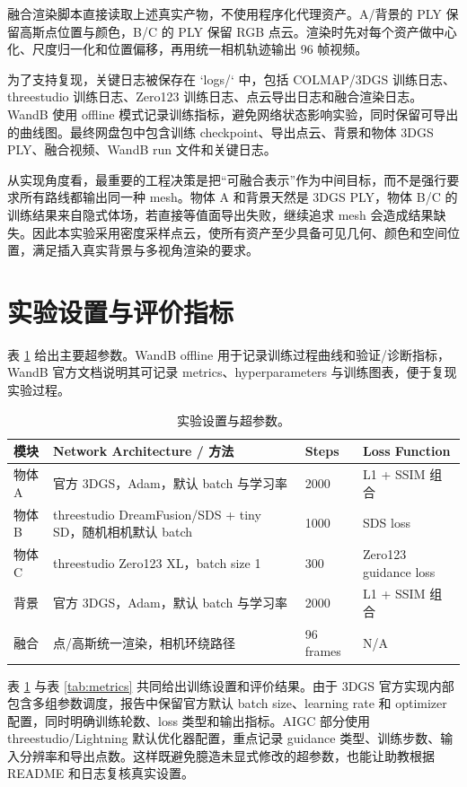 \documentclass[10pt,twocolumn]{ctexart}
\begin{document}
融合渲染脚本直接读取上述真实产物，不使用程序化代理资产。A/背景的 PLY 保留高斯点位置与颜色，B/C 的 PLY 保留 RGB 点云。渲染时先对每个资产做中心化、尺度归一化和位置偏移，再用统一相机轨迹输出 96 帧视频。

为了支持复现，关键日志被保存在 `logs/` 中，包括 COLMAP/3DGS 训练日志、threestudio 训练日志、Zero123 训练日志、点云导出日志和融合渲染日志。WandB 使用 offline 模式记录训练指标，避免网络状态影响实验，同时保留可导出的曲线图。最终网盘包中包含训练 checkpoint、导出点云、背景和物体 3DGS PLY、融合视频、WandB run 文件和关键日志。

从实现角度看，最重要的工程决策是把“可融合表示”作为中间目标，而不是强行要求所有路线都输出同一种 mesh。物体 A 和背景天然是 3DGS PLY，物体 B/C 的训练结果来自隐式体场，若直接等值面导出失败，继续追求 mesh 会造成结果缺失。因此本实验采用密度采样点云，使所有资产至少具备可见几何、颜色和空间位置，满足插入真实背景与多视角渲染的要求。

\section{实验设置与评价指标}
表 \ref{tab:hparams} 给出主要超参数。WandB offline 用于记录训练过程曲线和验证/诊断指标，WandB 官方文档说明其可记录 metrics、hyperparameters 与训练图表，便于复现实验过程\cite{wandbdocs}。

\begin{table}[H]
  \centering
  \caption{实验设置与超参数。}
  \label{tab:hparams}
  \scriptsize
  \begin{tabularx}{\columnwidth}{@{}l X X X@{}}
    \toprule
    模块 & Network Architecture / 方法 & Steps & Loss Function \\
    \midrule
    物体 A & 官方 3DGS，Adam，默认 batch 与学习率 & 2000 & L1 + SSIM 组合 \\
    物体 B & threestudio DreamFusion/SDS + tiny SD，随机相机默认 batch & 1000 & SDS loss \\
    物体 C & threestudio Zero123 XL，batch size 1 & 300 & Zero123 guidance loss \\
    背景 & 官方 3DGS，Adam，默认 batch 与学习率 & 2000 & L1 + SSIM 组合 \\
    融合 & 点/高斯统一渲染，相机环绕路径 & 96 frames & N/A \\
    \bottomrule
  \end{tabularx}
\end{table}

表 \ref{tab:hparams} 与表 \ref{tab:metrics} 共同给出训练设置和评价结果。由于 3DGS 官方实现内部包含多组参数调度，报告中保留官方默认 batch size、learning rate 和 optimizer 配置，同时明确训练轮数、loss 类型和输出指标。AIGC 部分使用 threestudio/Lightning 默认优化器配置，重点记录 guidance 类型、训练步数、输入分辨率和导出点数。这样既避免臆造未显式修改的超参数，也能让助教根据 README 和日志复核真实设置。
\end{document}
